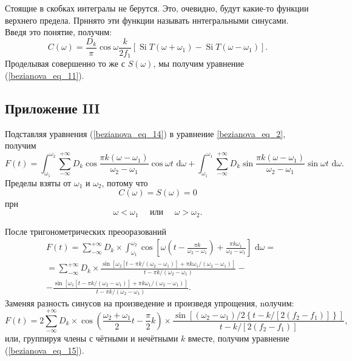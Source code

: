Стоящие в скобках интегралы не берутся. Это, очевидно, будут какие-то функции верхнего предела. Прннято эти функции называть ннтегральными синусами. Введя это понятие, получнм:
$$
C(\omega)=\frac{D_k}{\pi} \cos \omega \frac{k}{2 f_1}\left[\operatorname{Si} T\left(\omega+\omega_1\right)-\operatorname{Si} T\left(\omega-\omega_1\right)\right] .
$$
Проделывая совершенно то же с $S(\omega)$, мы получим уравнение (\ref{bezianova_eq_11}).

\subsection*{Приложение III}

\qquad Подставляя уравнения (\ref{bezianova_eq_14}) в уравнение \ref{bezianova_eq_2}, получим
$$
F(t)=\int_{\omega_1}^{\omega_2} \sum_{-\infty}^{+\infty} D_k \cos \frac{\pi k\left(\omega-\omega_1\right)}{\omega_2-\omega_1} \cos \omega t \text{ d} \omega+\int_{\omega_1}^{\omega_1} \sum_{-\infty}^{+\infty} D_k \sin \frac{\pi k\left(\omega-\omega_1\right)}{\omega_2-\omega_1} \sin \omega t \text{ d} \omega.
$$
Пределы взяты от $\omega_1$ и $\omega_2$, потому что
$$
C(\omega)=S(\omega)=0
$$
прн
$$
\omega<\omega_1 \quad \text { или } \quad \omega>\omega_2 .
$$

После тригонометрических преооразований
$$
\begin{aligned}
& F(t)=\sum_{-\infty}^{+\infty} D_k \times \int_{\omega_1}^{\omega_2} \cos \left[\omega\left(t-\frac{\pi k}{\omega_2-\omega_1}\right)+\frac{\pi k \omega_1}{\omega_2-\omega_1}\right] \text{ d} \omega= \\
&=\sum_{-\infty}^{+\infty} D_k \times \frac{\sin \left[\omega_2\left[t-\pi k /\left(\omega_2-\omega_1\right)\right]+\pi k \omega_1 /\left(\omega_2-\omega_1\right)\right]}{t-\pi k /\left(\omega_2-\omega_1\right)}- \\
&-\frac{\sin \left[\omega_1\left[t-\pi k /\left(\omega_2-\omega_1\right)\right]+\pi k \omega_1 /\left(\omega_2-\omega_1\right)\right]}{t-\pi k /\left(\omega_2-\omega_1\right)} .
\end{aligned}
$$
Заменяя разность синусов на произведение и произведя упрощения, nолучим:
$$
F(t)=2 \sum_{-\infty}^{+\infty} D_k \times \cos \left(\frac{\omega_2+\omega_1}{2} t-\frac{\pi}{2} k\right) \times \frac{\sin \left[\left(\omega_2-\omega_1\right) / 2\left\{t-k /\left[2\left(f_2-f_1\right)\right]\right\}\right]}{t-k /\left[2\left(f_2-f_1\right)\right]},
$$
или, группируя члены с чётными и нечётными $k$ вместе, получим уравнение (\ref{bezianova_eq_15}).

